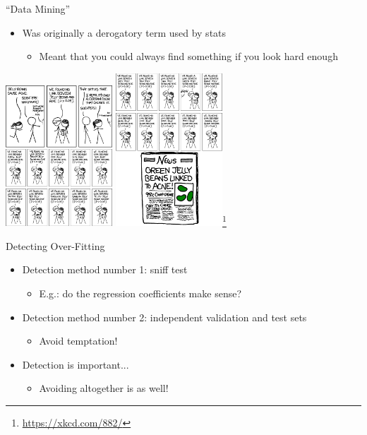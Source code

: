 \documentclass[aspectratio=169]{beamer}
\begin{document}
\begin{frame}{``Data Mining''}

\begin{itemize}
\item Was originally a derogatory term used by stats
	\begin{itemize}
	\item Meant that you could always find something if you look hard enough
	\end{itemize}
\end{itemize}
\hspace{6em}
\includegraphics[width=0.3\textwidth]{./lectReg/significant1.png}
\includegraphics[width=0.3\textwidth]{./lectReg/significant2.png}\footnote{\url{ https://xkcd.com/882/}}
\end{frame}


\begin{frame}{Detecting Over-Fitting}

\begin{itemize}
\item Detection method number 1: sniff test 
	\begin{itemize}
	\item E.g.: do the regression coefficients make sense?
	\end{itemize}
\item Detection method number 2: independent validation and test sets
	\begin{itemize}
	\item Avoid temptation!
	\end{itemize}
\item Detection is important...
	\begin{itemize}
	\item Avoiding altogether is as well!
	\end{itemize}
\end{itemize}
\end{frame}
\end{document}
